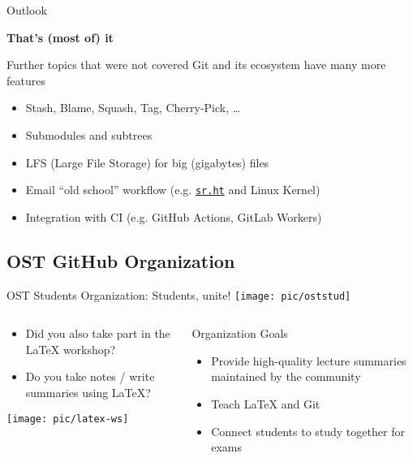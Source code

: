 \documentclass[xetex]{beamer}
\begin{document}
\begin{frame}{Outlook}

  \centering
  {
    \Huge\bfseries
    That's (most of) it
  }
  \vspace{1cm}

  \begin{block}{Further topics that were not covered}
    Git and its ecosystem have many more features
    \begin{itemize}
      \item Stash, Blame, Squash, Tag, Cherry-Pick, \ldots
      \item Submodules and subtrees
      \item LFS (Large File Storage) for big (gigabytes) files 
      \item Email ``old school'' workflow (e.g. \href{https://sr.ht}{\texttt{sr.ht}} and Linux Kernel)
      \item Integration with CI (e.g. GitHub Actions, GitLab Workers)
    \end{itemize}
  \end{block}
\end{frame}

\subsection{OST GitHub Organization}

\begin{frame}{OST Students Organization: Students, unite!}
  \texttt{[image: pic/oststud]}
  \begin{columns}[b]
    \begin{column}{.5\linewidth}
      \begin{itemize}
        \item Did you also take part in the \textrm{\LaTeX} workshop?
        \item Do you take notes / write summaries using \textrm{\LaTeX}?
      \end{itemize}
      \texttt{[image: pic/latex-ws]}
    \end{column}
    \begin{column}{.5\linewidth}
      \begin{block}{Organization Goals}
        \begin{itemize}
          \item Provide high-quality lecture summaries maintained by the community
          \item Teach \textrm{\LaTeX} and Git
          \item Connect students to study together for exams
        \end{itemize}
      \end{block}
    \end{column}
  \end{columns}
\end{frame}
\end{document}
